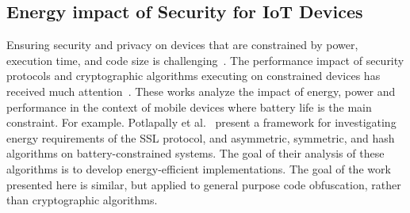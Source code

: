 \subsection{Energy impact of Security for IoT Devices}

Ensuring security and privacy on devices that are constrained by power, execution time, and code size is challenging~\cite{7823334, 6970594, 5675772}. The performance impact of security protocols and cryptographic algorithms executing on constrained devices has received much attention~\cite{potlapally2003analyzing, 5983970, 1347774, 5940923}. These works analyze the impact of energy, power and performance in the context of mobile devices where battery life is the main constraint. For example. Potlapally et al.~\cite{potlapally2003analyzing} present a framework for investigating energy requirements of the SSL protocol, and asymmetric, symmetric, and hash algorithms on battery-constrained systems. The goal of their analysis of these algorithms is to develop energy-efficient implementations. The goal of the work presented here is similar, but applied to general purpose code obfuscation, rather than cryptographic algorithms.

\endinput
This is the foundational idea for our work in analyzing the energy impact of various obfuscation techniques for IoTs.
\AR{Fixed}



The same concerns prevail while utilizing obfuscation techniques in such constraint devices, particularly IoTs, that handle sensitive data and run proprietary code requiring the need for code/data obfuscation to harden reverse engineering.